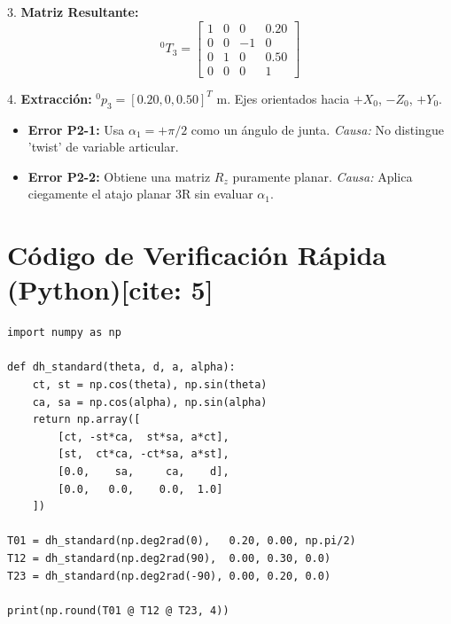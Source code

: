 \documentclass[11pt, a4paper]{article}
\begin{document}
3. \textbf{Matriz Resultante:}
\begin{equation*}
    {}^0T_3 = \begin{bmatrix} 1&0&0&0.20 \\ 0&0&-1&0 \\ 0&1&0&0.50 \\ 0&0&0&1 \end{bmatrix}
\end{equation*}

4. \textbf{Extracción:} ${}^0p_3 = [0.20, 0, 0.50]^T\text{ m}$. Ejes orientados hacia $+X_0$, $-Z_0$, $+Y_0$.

\begin{tcolorbox}[colback=red!5, colframe=red!75!black, title=Diagnóstico de Errores Comunes (Prob 2) {[cite: 5]}]
\begin{itemize}
    \item \textbf{Error P2-1:} Usa $\alpha_1=+\pi/2$ como un ángulo de junta. \textit{Causa:} No distingue 'twist' de variable articular.
    \item \textbf{Error P2-2:} Obtiene una matriz $R_z$ puramente planar. \textit{Causa:} Aplica ciegamente el atajo planar 3R sin evaluar $\alpha_1$.
\end{itemize}
\end{tcolorbox}

\section*{Código de Verificación Rápida (Python)[cite: 5]}
\begin{lstlisting}
import numpy as np

def dh_standard(theta, d, a, alpha):
    ct, st = np.cos(theta), np.sin(theta)
    ca, sa = np.cos(alpha), np.sin(alpha)
    return np.array([
        [ct, -st*ca,  st*sa, a*ct],
        [st,  ct*ca, -ct*sa, a*st],
        [0.0,    sa,     ca,    d],
        [0.0,   0.0,    0.0,  1.0]
    ])

T01 = dh_standard(np.deg2rad(0),   0.20, 0.00, np.pi/2)
T12 = dh_standard(np.deg2rad(90),  0.00, 0.30, 0.0)
T23 = dh_standard(np.deg2rad(-90), 0.00, 0.20, 0.0)

print(np.round(T01 @ T12 @ T23, 4))
\end{lstlisting}
\end{document}
